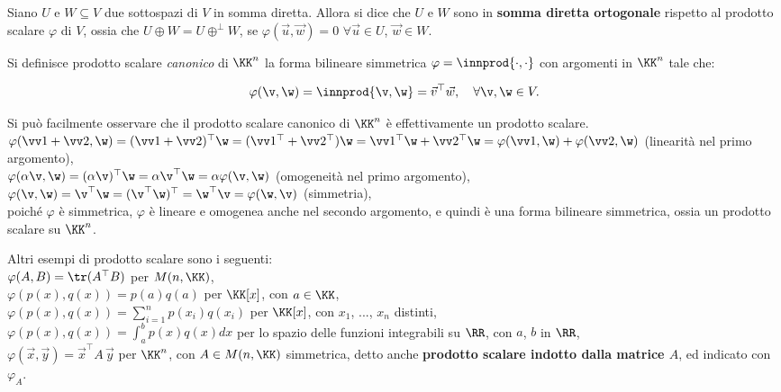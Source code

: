\begin{definition}
	Siano $U$ e $W \subseteq V$ due sottospazi di $V$ in somma diretta. Allora si dice che $U$ e $W$ sono in \textbf{somma diretta ortogonale} rispetto al prodotto scalare $\varphi$ di $V$, ossia che $U \oplus W = U \oplus^\perp W$, se $\varphi(\vec u, \vec w) = 0$ $\forall \vec u \in U$, $\vec w \in W$.
\end{definition}

\begin{definition}
	Si definisce prodotto scalare \textit{canonico} di $\KK^n$ la forma bilineare simmetrica $\varphi = \innprod{\cdot, \cdot}$ con
	argomenti in $\KK^n$ tale che:
	
	\[ \varphi(\v, \w) = \innprod{\v, \w} = \vec v ^\top \vec w, \quad \forall \v, \w \in V. \]
\end{definition}

\begin{remark}
	Si può facilmente osservare che il prodotto scalare canonico di $\KK^n$ è effettivamente un prodotto
	scalare. \\
	
	\li $\varphi(\vv 1 + \vv 2, \w) = (\vv 1 + \vv 2)^\top \w = (\vv 1 ^\top + \vv 2 ^\top) \w = \vv 1 ^\top \w + \vv 2 ^\top \w = \varphi(\vv 1, \w) + \varphi(\vv 2, \w)$ (linearità nel
	primo argomento), \\
	\li $\varphi(\alpha \v, \w) = (\alpha \v)^\top \w = \alpha \v^\top \w = \alpha \varphi(\v, \w)$ (omogeneità nel primo argomento), \\
	\li $\varphi(\v, \w) = \v ^\top \w = (\v ^\top \w)^\top = \w^\top \v = \varphi(\w, \v)$ (simmetria), \\
	\li poiché $\varphi$ è simmetrica, $\varphi$ è lineare e omogenea anche nel secondo argomento, e quindi è una
	forma bilineare simmetrica, ossia un prodotto scalare su $\KK^n$.
\end{remark}

\begin{example}
	Altri esempi di prodotto scalare sono i seguenti: \\
	
	\li $\varphi(A, B) = \tr(A^\top B)$ per $M(n, \KK)$, \\
	\li $\varphi(p(x), q(x)) = p(a) q(a)$ per $\KK[x]$, con $a \in \KK$, \\
	\li $\varphi(p(x), q(x)) = \sum_{i=1}^n p(x_i) q(x_i)$ per $\KK[x]$, con $x_1$, ..., $x_n$ distinti, \\
	\li $\varphi(p(x), q(x)) = \int_a^b p(x)q(x) dx$ per lo spazio delle funzioni integrabili su $\RR$, con $a$, $b$ in $\RR$, \\
	\li $\varphi(\vec{x}, \vec{y}) = \vec{x}^\top A \, \vec{y}$ per $\KK^n$, con $A \in M(n, \KK)$ simmetrica, detto anche \textbf{prodotto scalare indotto dalla matrice $A$}, ed indicato con $\varphi_A$.
\end{example}

